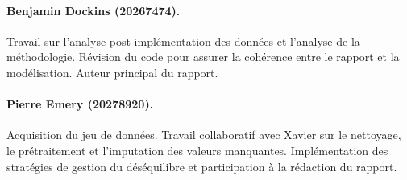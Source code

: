 \documentclass[11pt]{article}
\begin{document}
\paragraph{Benjamin Dockins (20267474).}
Travail sur l'analyse post-implémentation des données et l'analyse de la méthodologie. Révision du code pour assurer la cohérence entre le rapport et la modélisation. Auteur principal du rapport.

\paragraph{Pierre Emery (20278920).}
Acquisition du jeu de données. Travail collaboratif avec Xavier sur le 
nettoyage, le prétraitement et l'imputation des valeurs manquantes. 
Implémentation des stratégies de gestion du déséquilibre et participation à la 
rédaction du rapport.
 
 
\printbibliography
 
\end{document}
